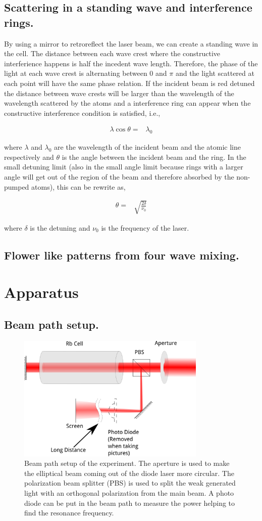 \documentclass[aps,twocolumn,secnumarabic,balancelastpage,amsmath,amssymb,nofootinbib]{revtex4}
\newcommand{\eqar}[1]
{
  \begin{align*}
    #1
  \end{align*}
}
\begin{document}
\subsection{Scattering in a standing wave and interference rings.}
By using a mirror to retroreflect the laser beam, we can create a standing wave in the cell. The distance between each wave crest where the constructive interferience happens is half the incedent wave length. Therefore, the phase of the light at each wave crest is alternating between $0$ and $\pi$ and the light scattered at each point will have the same phase relation. If the incident beam is red detuned the distance between wave crests will be larger than the wavelength of the wavelength scattered by the atoms and a interference ring can appear when the constructive interference condition is satisfied, i.e.,
\eqar{
  \lambda\cos\theta=&\lambda_0
}
where $\lambda$ and $\lambda_0$ are the wavelength of the incident beam and the atomic line respectively and $\theta$ is the angle between the incident beam and the ring. In the small detuning limit (also in the small angle limit because rings with a larger angle will get out of the region of the beam and therefore absorbed by the non-pumped atoms), this can be rewrite as,
\eqar{
  \theta=&\sqrt{\frac{2\delta}{\nu_0}}
}
where $\delta$ is the detuning and $\nu_0$ is the frequency of the laser.

\subsection{Flower like patterns from four wave mixing.}

\section{Apparatus}
\subsection{Beam path setup.}
\begin{figure}
  \includegraphics[width=9cm]{apparatus.png}
  \caption{Beam path setup of the experiment. The aperture is used to make the elliptical beam coming out of the diode laser more circular. The polarization beam splitter (PBS) is used to split the weak generated light with an orthogonal polarization from the main beam. A photo diode can be put in the beam path to measure the power helping to find the resonance frequency.}
  \label{apparatus}
\end{figure}
\end{document}
